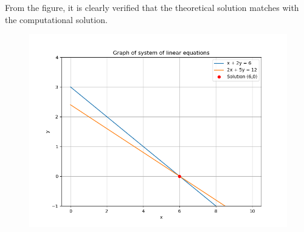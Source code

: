 \documentclass[journal]{IEEEtran}
\begin{document}
\newpage
\vspace*{0.25cm}

From the figure, it is clearly verified that the theoretical solution matches with the computational solution.\\

 \begin{figure}[H]
     \centering
     \includegraphics[width=0.7\columnwidth]{figs/img.png}
     \label{fig:1}
 \end{figure}
\end{document}
